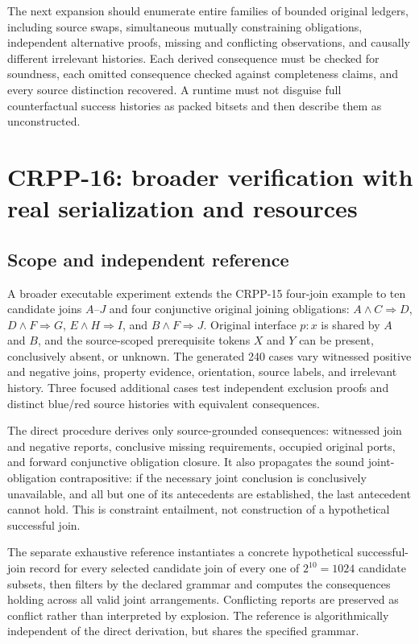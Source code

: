\documentclass[11pt]{article}
\begin{document}
The next expansion should enumerate entire families
of bounded original ledgers, including source swaps,
simultaneous mutually constraining obligations,
independent alternative proofs, missing and
conflicting observations, and causally different
irrelevant histories. Each derived consequence
must be checked for soundness, each omitted
consequence checked against completeness claims,
and every source distinction recovered. A runtime
must not disguise full counterfactual success
histories as packed bitsets and then describe
them as unconstructed.


\section{CRPP-16: broader verification with real serialization and resources}
\label{sec:crpp16}

\subsection{Scope and independent reference}
A broader executable experiment extends the CRPP-15
four-join example to ten candidate joins $A$--$J$ and
four conjunctive original joining obligations:
$A\wedge C\Rightarrow D$,
$D\wedge F\Rightarrow G$,
$E\wedge H\Rightarrow I$, and
$B\wedge F\Rightarrow J$.
Original interface $p{:}x$ is shared by $A$ and $B$,
and the source-scoped prerequisite tokens $X$ and $Y$
can be present, conclusively absent, or unknown.
The generated 240 cases vary witnessed positive and negative
joins, property evidence, orientation, source labels, and
irrelevant history. Three focused additional cases test
independent exclusion proofs and distinct blue/red source
histories with equivalent consequences.

The direct procedure derives only source-grounded consequences:
witnessed join and negative reports, conclusive missing
requirements, occupied original ports, and forward
conjunctive obligation closure. It also propagates the
sound joint-obligation contrapositive: if the necessary
joint conclusion is conclusively unavailable, and all
but one of its antecedents are established, the last
antecedent cannot hold. This is constraint entailment,
not construction of a hypothetical successful join.

The separate exhaustive reference instantiates a
concrete hypothetical successful-join record for every
selected candidate join of every one of $2^{10}=1024$
candidate subsets, then filters by the declared grammar
and computes the consequences holding across all valid
joint arrangements. Conflicting reports are preserved as
conflict rather than interpreted by explosion.
The reference is algorithmically independent of the
direct derivation, but shares the specified grammar.
\end{document}
